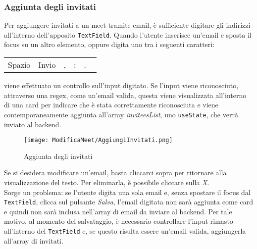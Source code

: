 \subsubsection{Aggiunta degli invitati}
Per aggiungere invitati a un meet tramite email, è sufficiente digitare gli indirizzi all'interno dell'apposito \texttt{TextField}. 
Quando l'utente inserisce un'email e sposta il focus su un altro elemento, oppure digita uno tra i seguenti caratteri:
\begin{center}
\begin{tabular}{c|c|c|c|c}
Spazio & Invio & , & ; & . \
\end{tabular}
\end{center}
viene effettuato un controllo sull'input digitato. Se l'input viene riconosciuto, attraverso una regex, come un'email valida, 
questa viene visualizzata all'interno di una card per indicare che è stata correttamente riconosciuta e viene contemporaneamente
aggiunta all'array \textit{inviteesList}, uno \texttt{useState}, che verrà inviato al backend.
\begin{figure}[H]
\centering
\texttt{[image: ModificaMeet/AggiungiInvitati.png]}
\caption{Aggiunta degli invitati}
\end{figure}
\noindent Se si desidera modificare un'email, basta cliccarci sopra per ritornare alla visualizzazione del testo. 
Per eliminarla, è possibile cliccare sulla \textit{X}. 
\\
Sorge un problema: se l'utente digita una sola email e, senza spostare il focus dal \texttt{TextField}, 
clicca sul pulsante \textit{Salva}, l'email digitata non sarà aggiunta come card e quindi non sarà inclusa nell'array
di email da inviare al backend. Per tale motivo, al momento del salvataggio, è necessario controllare l'input 
rimasto all'interno del \texttt{TextField} e, se questo risulta essere un'email valida, aggiungerla all'array di invitati.

